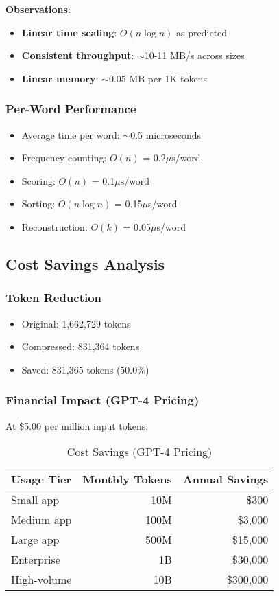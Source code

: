 \textbf{Observations}:
\begin{itemize}
    \item \textbf{Linear time scaling}: $O(n \log n)$ as predicted
    \item \textbf{Consistent throughput}: $\sim$10-11 MB/s across sizes
    \item \textbf{Linear memory}: $\sim$0.05 MB per 1K tokens
\end{itemize}

\subsubsection{Per-Word Performance}

\begin{itemize}
    \item Average time per word: $\sim$0.5 microseconds
    \item Frequency counting: $O(n)$ = 0.2$\mu$s/word
    \item Scoring: $O(n)$ = 0.1$\mu$s/word
    \item Sorting: $O(n \log n)$ = 0.15$\mu$s/word
    \item Reconstruction: $O(k)$ = 0.05$\mu$s/word
\end{itemize}

\subsection{Cost Savings Analysis}

\subsubsection{Token Reduction}

\begin{itemize}
    \item Original: 1,662,729 tokens
    \item Compressed: 831,364 tokens
    \item Saved: 831,365 tokens (50.0\%)
\end{itemize}

\subsubsection{Financial Impact (GPT-4 Pricing)}

At \$5.00 per million input tokens:

\begin{table}[h]
\centering
\caption{Cost Savings (GPT-4 Pricing)}
\label{tab:cost-savings}
\begin{tabular}{lrr}
\toprule
Usage Tier & Monthly Tokens & Annual Savings \\
\midrule
Small app & 10M & \$300 \\
Medium app & 100M & \$3,000 \\
Large app & 500M & \$15,000 \\
Enterprise & 1B & \$30,000 \\
High-volume & 10B & \$300,000 \\
\bottomrule
\end{tabular}
\end{table}

